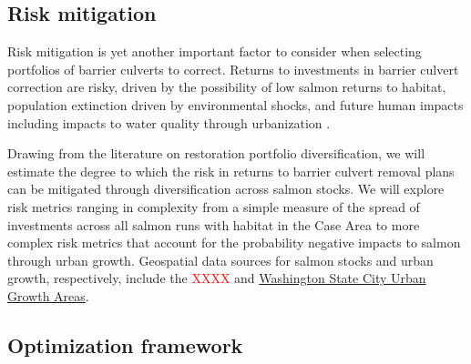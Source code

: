 \subsection*{Risk mitigation}

Risk mitigation is yet another important factor to consider when selecting portfolios of barrier culverts to correct. Returns to investments in barrier culvert correction are risky, driven by the possibility of low salmon returns to habitat, population extinction driven by environmental shocks, and future human impacts including impacts to water quality through urbanization \citep{ettinger_prioritizing_2021}. 


Drawing from the literature on restoration portfolio diversification, we will estimate the degree to which the risk in returns to barrier culvert removal plans can be mitigated through diversification across salmon stocks. We will explore risk metrics ranging in complexity from a simple measure of the spread of investments across all salmon runs with habitat in the Case Area to more complex risk metrics that account for the probability negative impacts to salmon through urban growth. Geospatial data sources for salmon stocks and urban growth, respectively, include the \textcolor{red}{XXXX} and \href{https://geo.wa.gov/datasets/wa-geoservices::washington-state-city-urban-growth-areas/about}{Washington State City Urban Growth Areas}.


\subsection*{Optimization framework \label{sec:opt}}

